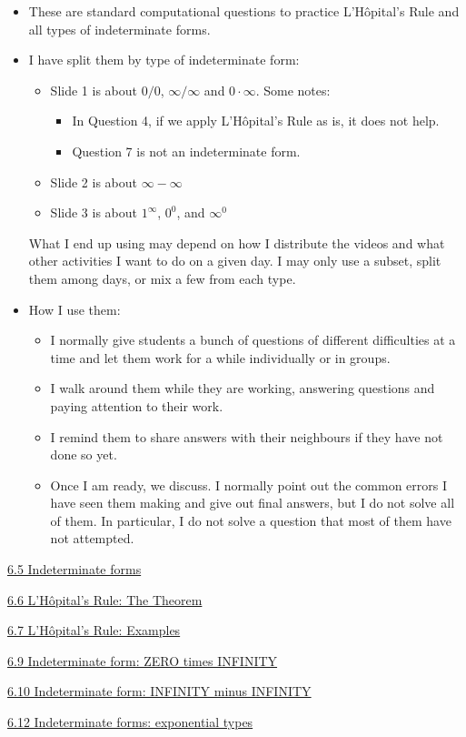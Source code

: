 \documentclass[11pt]{article}
\newcommand{\nl}{\hfill \vspace{-1.1\baselineskip}} %
\newcommand{\vv}{\hspace{8mm} \href{https://www.youtube.com/watch?v=yz8uZbi2wEk&list=PLlwePzQY_wW9EsqbQzPdJTNGsHYvO_2CJ&index=5}{6.5 Indeterminate forms}}
\newcommand{\vvi}{\hspace{8mm} \href{https://www.youtube.com/watch?v=6YvN79aDbjs&list=PLlwePzQY_wW9EsqbQzPdJTNGsHYvO_2CJ&index=6}{6.6 L'Hôpital's Rule: The Theorem}}
\newcommand{\vvii}{\hspace{8mm} \href{https://www.youtube.com/watch?v=aaee9hSP7Gw&list=PLlwePzQY_wW9EsqbQzPdJTNGsHYvO_2CJ&index=7}{6.7 L'Hôpital's Rule: Examples}}
\newcommand{\vix}{\hspace{8mm} \href{https://www.youtube.com/watch?v=TMlnlD4HCrA&list=PLlwePzQY_wW9EsqbQzPdJTNGsHYvO_2CJ&index=9}{6.9 Indeterminate form: ZERO times INFINITY}}
\newcommand{\vx}{\hspace{8mm} \href{https://www.youtube.com/watch?v=3EyFtXgJXTg&list=PLlwePzQY_wW9EsqbQzPdJTNGsHYvO_2CJ&index=10}{6.10 Indeterminate form: INFINITY minus INFINITY}}
\newcommand{\vxii}{\hspace{8mm} \href{https://www.youtube.com/watch?v=ySxaqDTcWgk&list=PLlwePzQY_wW9EsqbQzPdJTNGsHYvO_2CJ&index=12}{6.12 Indeterminate forms: exponential types}}
\begin{document}
\begin{comments}
\nl
	\begin{itemize}
		\item  These are standard computational questions to practice L'H\^{o}pital's Rule and all types of indeterminate forms.
		\item  I have split them by type of indeterminate form:
			\begin{itemize}
				\item  Slide 1 is about $0/0$, $\infty/\infty$ and $0 \cdot \infty$.  Some notes:
					\begin{itemize}
						\item In Question 4, if we apply L'H\^{o}pital's Rule as is, it does not help.
						\item Question 7 is not an indeterminate form.
					\end{itemize}
				\item  Slide 2 is about $\infty - \infty$
				\item  Slide 3 is about $1^{\infty}$, $0^0$, and $\infty^{0}$
			\end{itemize}
		What I end up using may depend on how I distribute the videos and what other activities I want to do on a given day.  I may only use a subset, split them among days, or mix a few from each type.
		\item  How I use them:
			\begin{itemize}
				\item	I normally give students a bunch of questions of different difficulties at a time and let them work for a while individually or in groups.
				\item I walk around them while they are working, answering questions and paying attention to their work.
				\item I remind them to share answers with their neighbours if they have not done so yet.
				\item Once I am ready, we discuss.  I normally point out the common errors I have seen them making and give out final answers, but I do not solve all of them.  In particular, I do not solve a question that most of them have not attempted.
			\end{itemize}
	\end{itemize}
\end{comments}

\begin{videos}
\vv

\vvi

\vvii

\vix

\vx

\vxii
\end{videos}
\end{document}
